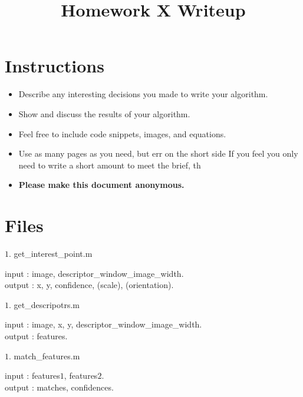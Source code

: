 \date{}

\title{\vspace{-1cm}Homework X Writeup}



\maketitle
\vspace{-3cm}
\thispagestyle{fancy}

\section*{Instructions}
\begin{itemize}
  \item Describe any interesting decisions you made to write your algorithm.
  \item Show and discuss the results of your algorithm.
  \item Feel free to include code snippets, images, and equations.
  \item Use as many pages as you need, but err on the short side If you feel you only need to write a short amount to meet the brief, th
  
  \item \textbf{Please make this document anonymous.}
\end{itemize}
\newcommand\tab[1][1cm]{\hspace*{#1}}
\section*{Files}

{\large $1.$ get\_interest\_point.m \par}
\tab input : image, descriptor\_window\_image\_width. \\
\tab output : x, y, confidence, (scale), (orientation).

{\large $1.$ get\_descripotrs.m \par}
\tab input : image, x, y, descriptor\_window\_image\_width. \\
\tab output : features.

{\large $1.$ match\_features.m \par}
\tab input : features$1$, features$2$.\\
\tab output : matches, confidences.

